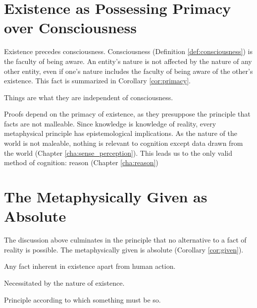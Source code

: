     \section{Existence as Possessing Primacy over Consciousness}
        
        Existence precedes consciousness. Consciousness (Definition \ref{def:consciousness}) is the faculty of being aware. An entity's nature is not affected by the nature of any other entity, even if one's nature includes the faculty of being aware of the other's existence. This fact is summarized in Corollary \ref{cor:primacy}.
        
            \begin{corollary}
            \label{cor:primacy}
                Things are what they are independent of consciousness.
            \end{corollary}
        
        Proofs depend on the primacy of existence, as they presuppose the principle that facts are not malleable. Since knowledge is knowledge of reality, every metaphysical principle has epistemological implications. As the nature of the world is not maleable, nothing is relevant to cognition except data drawn from the world (Chapter \ref{cha:sense_perception}). This leads us to the only valid method of cognition: reason (Chapter \ref{cha:reason})
            
    \section{The Metaphysically Given as Absolute}
    
        The discussion above culminates in the principle that no alternative to a fact of reality is possible. The metaphysically given is absolute (Corollary \ref{cor:given}).
    
            \begin{definition}
                Any fact inherent in existence apart from human action.
            \end{definition}
            
            \begin{definition}[Absolute]
                Necessitated by the nature of existence.
            \end{definition}

            \begin{definition}[Necessity]
                Principle according to which something must be so.
            \end{definition}
            
